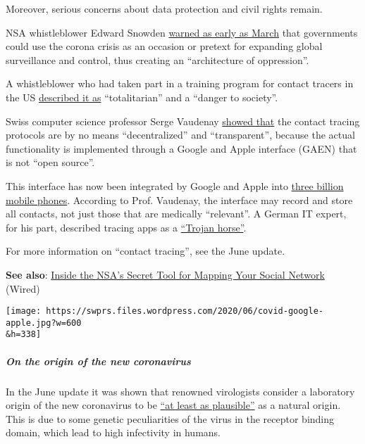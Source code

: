 Moreover, serious concerns about data protection and civil rights
remain.

NSA whistleblower Edward Snowden
\href{https://www.youtube.com/watch?v=-pcQFTzck_c}{warned as early as
March} that governments could use the corona crisis as an occasion or
pretext for expanding global surveillance and control, thus creating an
``architecture of oppression''.

A whistleblower who had taken part in a training program for contact
tracers in the US
\href{https://www.youtube.com/watch?v=qFUyZWw7qoc}{described it as}
``totalitarian'' and a ``danger to society''.

Swiss computer science professor Serge Vaudenay
\href{https://lasec.epfl.ch/people/vaudenay/swisscovid.html}{showed
that} the contact tracing protocols are by no means ``decentralized''
and ``transparent'', because the actual functionality is implemented
through a Google and Apple interface (GAEN) that is not ``open source''.

This interface has now been integrated by Google and Apple into
\href{https://www.bloomberg.com/news/articles/2020-04-10/apple-google-bring-covid-19-contact-tracing-to-3-billion-people}{three
billion mobile phones}. According to Prof. Vaudenay, the interface may
record and store all contacts, not just those that are medically
``relevant''. A German IT expert, for his part, described tracing apps
as a
\href{https://www.heise.de/news/Informatiker-Die-Corona-App-ist-wie-ein-trojanisches-Pferd-4764560.html}{``Trojan
horse''}.

For more information on ``contact tracing'', see the June update.

\textbf{See also}:
\href{https://www.wired.com/story/inside-the-nsas-secret-tool-for-mapping-your-social-network/}{Inside
the NSA's Secret Tool for Mapping Your Social Network} (Wired)

\texttt{[image: https://swprs.files.wordpress.com/2020/06/covid-google-apple.jpg?w=600\\\&h=338]}

\hypertarget{on-the-origin-of-the-new-coronavirus}{%
\subparagraph{\texorpdfstring{\textbf{On the origin of the new
coronavirus}}{On the origin of the new coronavirus}}\label{on-the-origin-of-the-new-coronavirus}}

In the June update it was shown that renowned virologists consider a
laboratory origin of the new coronavirus to be
\href{https://www.independentsciencenews.org/health/the-case-is-building-that-covid-19-had-a-lab-origin/}{``at
least as plausible''} as a natural origin. This is due to some genetic
peculiarities of the virus in the receptor binding domain, which lead to
high infectivity in humans.

